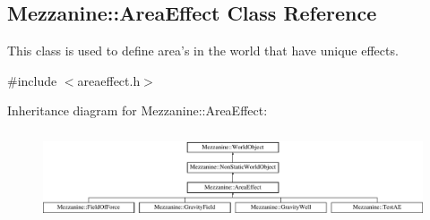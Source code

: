 \hypertarget{classMezzanine_1_1AreaEffect}{
\subsection{Mezzanine::AreaEffect Class Reference}
\label{classMezzanine_1_1AreaEffect}
}


This class is used to define area's in the world that have unique effects.  




{\ttfamily \#include $<$areaeffect.h$>$}

Inheritance diagram for Mezzanine::AreaEffect:\begin{figure}[H]
\begin{center}
\leavevmode
\includegraphics[height=2.654028cm]{classMezzanine_1_1AreaEffect}
\end{center}
\end{figure}
